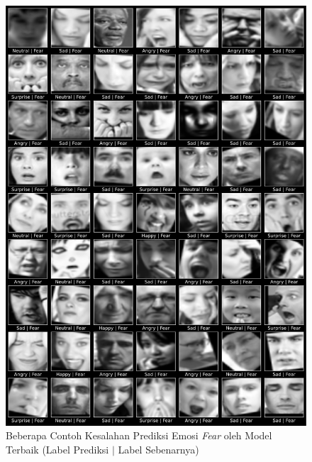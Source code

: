 \begin{figure}[t]
    \centering
    \includegraphics[width=14cm]{gambar/contoh_hasil_prediksi_false_fear.png}
    \caption{Beberapa Contoh Kesalahan Prediksi Emosi \textit{Fear} oleh Model Terbaik (Label Prediksi $|$ Label Sebenarnya)}
    \label{fig:hasilprediksifalse2}
\end{figure}


